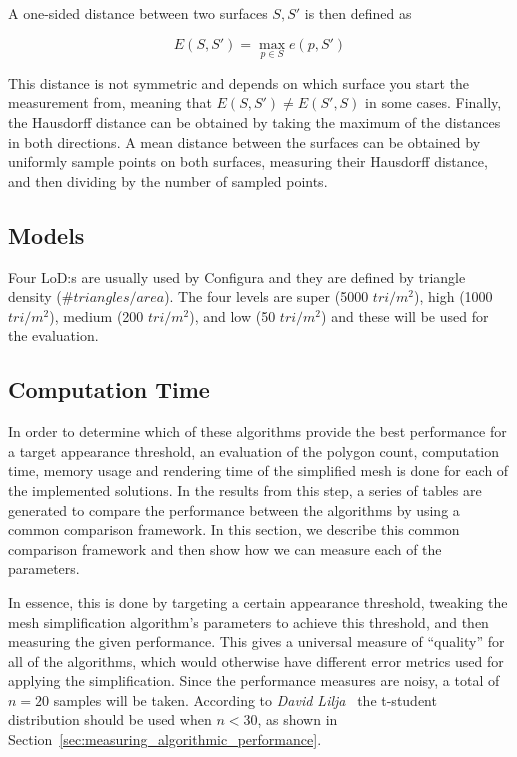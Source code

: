 A one-sided distance between two surfaces \(S, S'\) is then defined as

\[E(S, S') = \max_{p \in S} e(p, S')\]

This distance is not symmetric and depends on which surface you start the measurement from, meaning that \(E(S, S') \neq E(S', S)\) in some cases. Finally, the Hausdorff distance can be obtained by taking the maximum of the distances in both directions. A mean distance between the surfaces can be obtained by uniformly sample points on both surfaces, measuring their Hausdorff distance, and then dividing by the number of sampled points.

\subsection{Models}
Four LoD:s are usually used by Configura and they are defined by triangle density ($\#triangles/area$). The four levels are super (5000 $tri/m^2$), high (1000 $tri/m^2$), medium (200 $tri/m^2$), and low  (50 $tri/m^2$) and these will be used for the evaluation.

\subsection{Computation Time}


\iffalse
In order to determine which of these algorithms provide the best performance for a target appearance threshold, an evaluation of the polygon count, computation time, memory usage and rendering time of the simplified mesh is done for each of the implemented solutions. In the results from this step, a series of tables are generated to compare the performance between the algorithms by using a common comparison framework. In this section, we describe this common comparison framework and then show how we can measure each of the parameters.

In essence, this is done by targeting a certain appearance threshold, tweaking the mesh simplification algorithm's parameters to achieve this threshold, and then measuring the given performance. This gives a universal measure of ``quality'' for all of the algorithms, which would otherwise have different error metrics used for applying the simplification. Since the performance measures are noisy, a total of \(n=20\) samples will be taken. According to \emph{David Lilja}~\cite[p.~50]{lilja2005measuring} the t-student distribution should be used when \(n < 30\), as shown in Section~\ref{sec:measuring_algorithmic_performance}.

